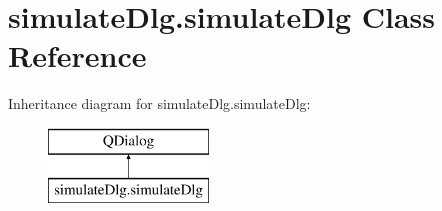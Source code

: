 \hypertarget{classsimulate_dlg_1_1simulate_dlg}{\section{simulate\-Dlg.\-simulate\-Dlg Class Reference}
\label{classsimulate_dlg_1_1simulate_dlg}
}
Inheritance diagram for simulate\-Dlg.\-simulate\-Dlg\-:\begin{figure}[H]
\begin{center}
\leavevmode
\includegraphics[height=2.000000cm]{classsimulate_dlg_1_1simulate_dlg}
\end{center}
\end{figure}
